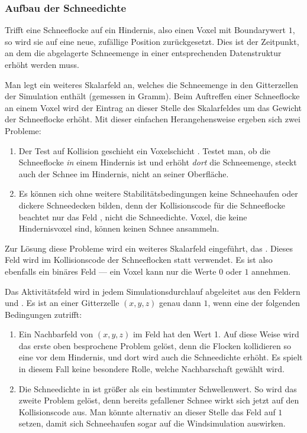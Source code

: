 \subsubsection{Aufbau der Schneedichte}

Trifft eine Schneeflocke auf ein Hindernis, also einen Voxel mit
Boundarywert $1$, so wird sie auf eine neue, zufällige Position
zurückgesetzt. Dies ist der Zeitpunkt, an dem die abgelagerte
Schneemenge in einer entsprechenden Datenstruktur erhöht werden muss.

Man legt ein weiteres Skalarfeld  an,
welches die Schneemenge in den Gitterzellen der Simulation enthält
(\PimiddyzB gemessen in Gramm). Beim Auftreffen einer Schneeflocke an
einem Voxel wird der Eintrag an dieser Stelle des Skalarfeldes um das
Gewicht der Schneeflocke erhöht. Mit dieser einfachen Herangehensweise
ergeben sich zwei Probleme:

\begin{enumerate}
\item Der Test auf Kollision geschieht ein Voxelschicht
. Testet man, ob die Schneeflocke \emph{in}
einem Hindernis ist und erhöht \emph{dort} die Schneemenge, steckt
auch der Schnee im Hindernis, nicht an seiner Oberfläche.
\item Es können sich ohne weitere Stabilitätsbedingungen keine
Schneehaufen oder dickere Schneedecken bilden, denn der Kollisionscode
für die Schneeflocke beachtet nur das Feld
, nicht die Schneedichte. Voxel, die keine
Hindernisvoxel sind, können keinen Schnee ansammeln.
\end{enumerate}

Zur Lösung diese Probleme wird ein weiteres Skalarfeld eingeführt, das
 . Dieses
Feld wird im Kollisionscode der Schneeflocken statt
 verwendet. Es ist also ebenfalls ein
binäres Feld --- ein Voxel kann nur die Werte $0$ oder $1$ annehmen.

Das Aktivitätsfeld wird in jedem Simulationsdurchlauf abgeleitet aus
den Feldern  und
. Es ist an einer Gitterzelle
$(x,y,z)$ genau dann $1$, wenn eine der folgenden Bedingungen
zutrifft:

\begin{enumerate}
\item Ein Nachbarfeld von $(x,y,z)$ im Feld
 hat den Wert 1. Auf diese Weise wird das
erste oben besprochene Problem gelöst, denn die Flocken kollidieren so
eine  vor dem Hindernis, und dort wird auch die
Schneedichte erhöht. Es spielt in diesem Fall keine besondere Rolle,
welche Nachbarschaft gewählt wird.
\item Die Schneedichte in  ist größer
als ein bestimmter Schwellenwert. So wird das zweite Problem gelöst,
denn bereits gefallener Schnee wirkt sich jetzt auf den Kollisionscode
aus. Man könnte alternativ an dieser Stelle das Feld
 auf $1$ setzen, damit sich Schneehaufen
sogar auf die Windsimulation auswirken.
\end{enumerate}

